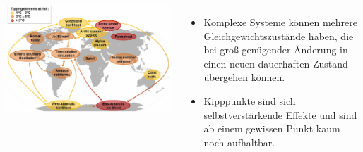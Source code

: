 \begin{frame}
\begin{columns}
	\end{columns}
	\begin{columns}
			\includegraphics[width=0.9\linewidth]{bilder/kipppunkte/tipping_elements}
			\begin{itemize}
				\item Komplexe Systeme können mehrere Gleichgewichtszustände haben, die bei groß genügender Änderung in einen neuen dauerhaften Zustand übergehen können.
				\item Kipppunkte sind sich selbstverstärkende Effekte und sind ab einem gewissen Punkt kaum noch aufhaltbar.
			\end{itemize}
	\end{columns}
\end{frame}
